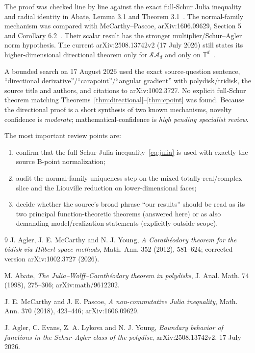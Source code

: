 \documentclass[11pt]{article}
\theoremstyle{definition}
\theoremstyle{remark}
\newcommand{\T}{\mathbb T}
\newcommand{\SA}{\mathcal{SA}}
\begin{document}
The proof was checked line by line against the exact full-Schur Julia inequality and radial identity in Abate, Lemma 3.1 and Theorem 3.1~\cite{Abate}.  The normal-family mechanism was compared with McCarthy--Pascoe, arXiv:1606.09629, Section 5 and Corollary 6.2~\cite{MP}.  Their scalar result has the stronger multiplier/Schur--Agler norm hypothesis.  The current arXiv:2508.13742v2 (17 July 2026) still states its higher-dimensional directional theorem only for \(\SA_d\) and only on \(\T^d\)~\cite{AELY}.

A bounded search on 17 August 2026 used the exact source-question sentence, ``directional derivative''/``carapoint''/``angular gradient'' with polydisk/tridisk, the source title and authors, and citations to arXiv:1002.3727.  No explicit full-Schur theorem matching Theorems~\ref{thm:directional}--\ref{thm:cpoint} was found.  Because the directional proof is a short synthesis of two known mechanisms, novelty confidence is \emph{moderate}; mathematical-confidence is \emph{high pending specialist review}.

The most important review points are:
\begin{enumerate}
\item confirm that the full-Schur Julia inequality~\eqref{eq:julia} is used with exactly the source B-point normalization;
\item audit the normal-family uniqueness step on the mixed totally-real/complex slice and the Liouville reduction on lower-dimensional faces;
\item decide whether the source's broad phrase ``our results'' should be read as its two principal function-theoretic theorems (answered here) or as also demanding model/realization statements (explicitly outside scope).
\end{enumerate}

\begin{thebibliography}{9}
J. Agler, J. E. McCarthy and N. J. Young,
\emph{A Carath\'eodory theorem for the bidisk via Hilbert space methods},
Math. Ann. 352 (2012), 581--624; corrected version arXiv:1002.3727 (2026).

M. Abate,
\emph{The Julia--Wolff--Carath\'eodory theorem in polydisks},
J. Anal. Math. 74 (1998), 275--306; arXiv:math/9612202.

J. E. McCarthy and J. E. Pascoe,
\emph{A non-commutative Julia inequality},
Math. Ann. 370 (2018), 423--446; arXiv:1606.09629.

J. Agler, C. Evans, Z. A. Lykova and N. J. Young,
\emph{Boundary behavior of functions in the Schur--Agler class of the polydisc},
arXiv:2508.13742v2, 17 July 2026.
\end{thebibliography}
\end{document}
